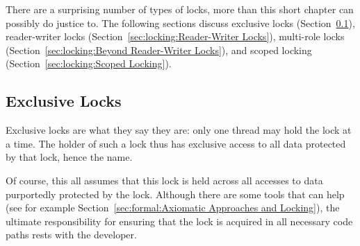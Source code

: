 There are a surprising number of types of locks, more than this
short chapter can possibly do justice to.
The following sections discuss
exclusive locks (Section~\ref{sec:locking:Exclusive Locks}),
reader-writer locks (Section~\ref{sec:locking:Reader-Writer Locks}),
multi-role locks (Section~\ref{sec:locking:Beyond Reader-Writer Locks}),
and scoped locking (Section~\ref{sec:locking:Scoped Locking}).

\subsection{Exclusive Locks}
\label{sec:locking:Exclusive Locks}

Exclusive locks are what they say they are: only one thread may hold
the lock at a time.
The holder of such a lock thus has exclusive access to all data protected
by that lock, hence the name.

Of course, this all assumes that this lock is held across all accesses
to data purportedly protected by the lock.
Although there are some tools that can help (see for example
Section~\ref{sec:formal:Axiomatic Approaches and Locking}),
the ultimate responsibility for ensuring that the lock is acquired in
all necessary code paths rests with the developer.

